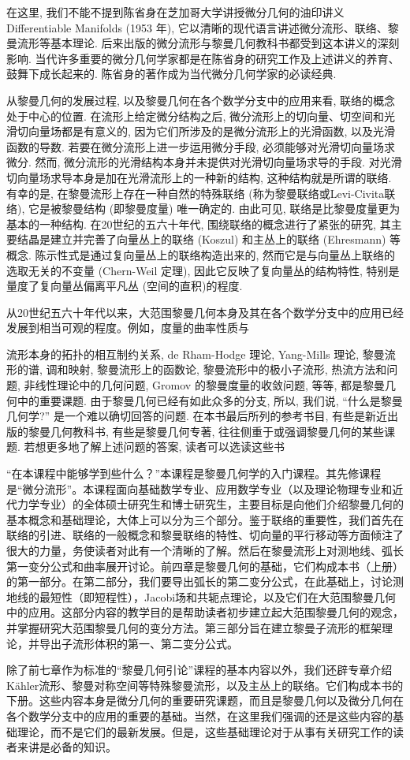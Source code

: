 在这里, 我们不能不提到陈省身在芝加哥大学讲授微分几何的油印讲义 Differentiable Manifolds (1953 年), 它以清晰的现代语言讲述微分流形、联络、黎曼流形等基本理论. 后来出版的微分流形与黎曼几何教科书都受到这本讲义的深刻影响. 当代许多重要的微分几何学家都是在陈省身的研究工作及上述讲义的养育、鼓舞下成长起来的. 陈省身的著作成为当代微分几何学家的必读经典.

从黎曼几何的发展过程, 以及黎曼几何在各个数学分支中的应用来看, 联络的概念处于中心的位置. 在流形上给定微分结构之后, 微分流形上的切向量、切空间和光滑切向量场都是有意义的, 因为它们所涉及的是微分流形上的光滑函数, 以及光滑函数的导数. 若要在微分流形上进一步运用微分手段, 必须能够对光滑切向量场求微分. 然而, 微分流形的光滑结构本身并未提供对光滑切向量场求导的手段. 对光滑切向量场求导本身是加在光滑流形上的一种新的结构, 这种结构就是所谓的联络. 有幸的是, 在黎曼流形上存在一种自然的特殊联络 (称为黎曼联络或Levi-Civita联络), 它是被黎曼结构 (即黎曼度量) 唯一确定的. 由此可见, 联络是比黎曼度量更为基本的一种结构. 在20世纪的五六十年代, 围绕联络的概念进行了紧张的研究, 其主要结晶是建立并完善了向量丛上的联络 (Koszul) 和主丛上的联络 (Ehresmann) 等概念. 陈示性式是通过复向量丛上的联络构造出来的, 然而它是与向量丛上联络的选取无关的不变量 (Chern-Weil 定理), 因此它反映了复向量丛的结构特性, 特别是量度了复向量丛偏离平凡丛 (空间的直积)的程度.

从20世纪五六十年代以来，大范围黎曼几何本身及其在各个数学分支中的应用已经发展到相当可观的程度。例如，度量的曲率性质与

流形本身的拓扑的相互制约关系, de Rham-Hodge 理论, Yang-Mills 理论, 黎曼流形的谱, 调和映射, 黎曼流形上的函数论, 黎曼流形中的极小子流形, 热流方法和问题, 非线性理论中的几何问题, Gromov 的黎曼度量的收敛问题, 等等, 都是黎曼几何中的重要课题. 由于黎曼几何已经有如此众多的分支, 所以, 我们说, “什么是黎曼几何学?” 是一个难以确切回答的问题. 在本书最后所列的参考书目, 有些是新近出版的黎曼几何教科书, 有些是黎曼几何专著, 往往侧重于或强调黎曼几何的某些课题. 若想更多地了解上述问题的答案, 读者可以选读这些书

“在本课程中能够学到些什么？”本课程是黎曼几何学的入门课程。其先修课程是“微分流形”。本课程面向基础数学专业、应用数学专业（以及理论物理专业和近代力学专业）的全体硕士研究生和博士研究生，主要目标是向他们介绍黎曼几何的基本概念和基础理论，大体上可以分为三个部分。鉴于联络的重要性，我们首先在联络的引进、联络的一般概念和黎曼联络的特性、切向量的平行移动等方面倾注了很大的力量，务使读者对此有一个清晰的了解。然后在黎曼流形上对测地线、弧长第一变分公式和曲率展开讨论。前四章是黎曼几何的基础，它们构成本书（上册）的第一部分。在第二部分，我们要导出弧长的第二变分公式，在此基础上，讨论测地线的最短性（即短程性），Jacobi场和共轭点理论，以及它们在大范围黎曼几何中的应用。这部分内容的教学目的是帮助读者初步建立起大范围黎曼几何的观念，并掌握研究大范围黎曼几何的变分方法。第三部分旨在建立黎曼子流形的框架理论，并导出子流形体积的第一、第二变分公式。

除了前七章作为标准的“黎曼几何引论”课程的基本内容以外，我们还辟专章介绍Kähler流形、黎曼对称空间等特殊黎曼流形，以及主丛上的联络。它们构成本书的下册。这些内容本身是微分几何的重要研究课题，而且是黎曼几何以及微分几何在各个数学分支中的应用的重要的基础。当然，在这里我们强调的还是这些内容的基础理论，而不是它们的最新发展。但是，这些基础理论对于从事有关研究工作的读者来讲是必备的知识。
